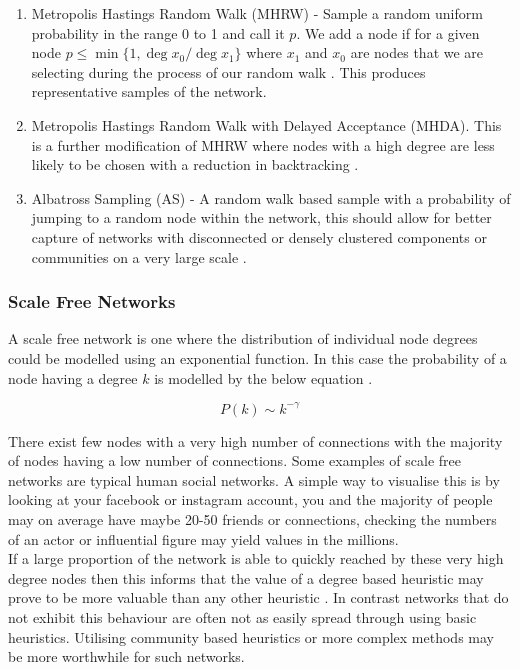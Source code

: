 \documentclass{article}
\begin{document}
\begin{enumerate}
	\item Metropolis Hastings Random Walk (MHRW) - Sample a random uniform probability in the range 0 to 1 and call it $p$. We add a node if for a given node $p \leq \min\{1, \deg{x_0} / \deg {x_1}\}$ where $x_1$ and $x_0$ are nodes that we are selecting during the process of our random walk \cite{gjoka2010}. This produces representative samples of the network.
	\item Metropolis Hastings Random Walk with Delayed Acceptance (MHDA). This is a further modification of MHRW where nodes with a high degree are less likely to be chosen with a reduction in backtracking \cite{lee2012randomwalkmetropolishastingssamplers}.
	\item Albatross Sampling (AS) - A random walk based sample with a probability of jumping to a random node within the network, this should allow for better capture of networks with disconnected or densely clustered components or communities on a very large scale \cite{jin2011albatross}.
\end{enumerate}

\subsubsection{Scale Free Networks}
A scale free network is one where the distribution of individual node degrees could be modelled using an exponential function.
In this case the probability of a node having a degree $k$ is modelled by the below equation \cite{satorras2008scalefree}.

\begin{equation}
	P(k) \sim k^{-\gamma}
\end{equation}

There exist few nodes with a very high number of connections with the majority of nodes having a low number of connections.
Some examples of scale free networks are typical human social networks.
A simple way to visualise this is by looking at your facebook or instagram account, you and the majority of people may on average have maybe 20-50 friends or connections, checking the numbers of an actor or influential figure may yield values in the millions.
\\

If a large proportion of the network is able to quickly reached by these very high degree nodes then this informs that the value of a degree based heuristic may prove to be more valuable than any other heuristic \cite{tardoskempe2003}.
In contrast networks that do not exhibit this behaviour are often not as easily spread through using basic heuristics.
Utilising community based heuristics or more complex methods may be more worthwhile for such networks.
\end{document}
